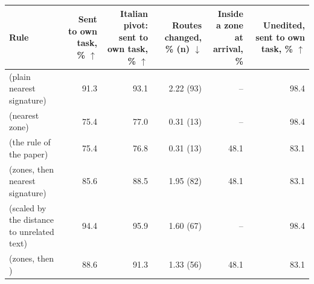 \begin{tabular}{lrrrrr}
    \toprule
    Rule & \shortstack[r]{Sent to own\\task, \% $\uparrow$} & \shortstack[r]{Italian pivot: sent\\to own task, \% $\uparrow$} & \shortstack[r]{Routes changed,\\\% (n) $\downarrow$} & \shortstack[r]{Inside a zone\\at arrival, \%} & \shortstack[r]{Unedited, sent to\\own task, \% $\uparrow$} \\
    \midrule
    \signature{} (plain nearest signature) & 91.3 & 93.1 & 2.22 (93) & -- & 98.4 \\
    \nearest{} (nearest zone) & 75.4 & 77.0 & 0.31 (13) & -- & 98.4 \\
    \cert{} (the rule of the paper) & 75.4 & 76.8 & 0.31 (13) & 48.1 & 83.1 \\
    \hybrid{} (zones, then nearest signature) & 85.6 & 88.5 & 1.95 (82) & 48.1 & 83.1 \\
    \scaled{} (scaled by the distance to unrelated text) & 94.4 & 95.9 & 1.60 (67) & -- & 98.4 \\
    \certscaled{} (zones, then \scaled{}) & 88.6 & 91.3 & 1.33 (56) & 48.1 & 83.1 \\
    \bottomrule
\end{tabular}
